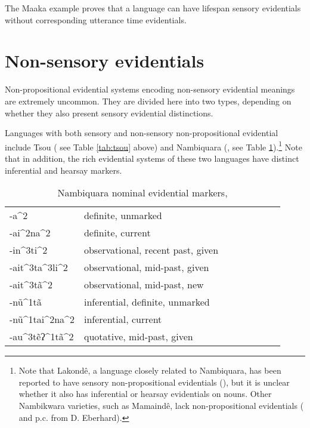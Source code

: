 \documentclass[oneside,a4paper,11pt]{article}
\newcommand{\ipa}[1]{{\phon \mbox{#1}}} %
\begin{document}
 The Maaka example proves that a language can have lifespan sensory evidentials without corresponding utterance time evidentials.
  
\section{Non-sensory evidentials} \label{sec:nonsens}
Non-propositional evidential systems encoding non-sensory evidential meanings are extremely uncommon. They are divided here into two types, depending on whether they also present sensory evidential distinctions.

Languages with  both sensory and non-sensory non-propositional evidential include Tsou (\citealt{yang00tsou.case} see Table \ref{tab:tsou} above) and Nambiquara (\citealt{lowe99nambiquara}, see Table \ref{tab:nambiquara}).\footnote{Note that Lakondê, a language closely related to Nambiquara, has been reported to have sensory non-propositional evidentials (\citealt[248-9]{wetzels06lakonde}), but it is unclear whether it also has inferential or hearsay evidentials on nouns. Other Nambikwara varieties, such as Mamaindê, lack non-propositional evidentials (\citealt{eberhard09nambikwara} and p.c. from D. Eberhard).} Note that in addition, the rich evidential systems of these two languages have distinct inferential and hearsay markers. 


 \begin{table}[H]
 \caption{Nambiquara nominal evidential markers, \citet[282]{lowe99nambiquara} } \centering \label{tab:nambiquara}
\begin{tabular}{llllllll}
\toprule
\ipa{-a^2} & definite, unmarked \\
\ipa{-ai^2na^2} & definite, current \\
\ipa{-in^3ti^2} & observational, recent past, given \\
\ipa{-ait^3ta^3li^2} & observational, mid-past, given \\
\ipa{-ait^3tã^2} & observational, mid-past, new \\
\ipa{-nũ^1tã} & inferential, definite, unmarked \\
\ipa{-nũ^1tai^2na^2} & inferential, current \\
\ipa{-au^3tẽʔ^1tã^2} & quotative, mid-past, given \\
\bottomrule
\end{tabular}
\end{table}


 
 
\end{document}
